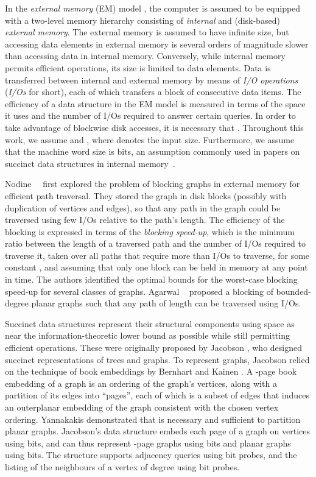 In the \emph{external memory} (EM) model \cite{DBLP:journals/cacm/AggarwalV88}, the
computer is assumed to be equipped with a two-level memory hierarchy
consisting of \emph{internal} and (disk-based) \emph{external memory}.
The external memory is assumed to have infinite size, but accessing data
elements in external memory is several orders of magnitude slower than accessing
data in internal memory.
Conversely, while internal memory permits efficient operations, its size is limited 
to  data elements.
Data is transferred between internal and external memory by means of
\emph{I/O operations} (\emph{I/Os} for short), each of which transfers
a block of  consecutive data items. 
The efficiency of a data structure in the EM model is measured in terms of the
space it uses and the number of I/Os required to answer certain queries.
In order to take advantage of blockwise disk accesses, it is necessary that .
Throughout this work, we assume  and ,
where  denotes the input size. Furthermore, we assume that the machine
word size is  bits, an assumption commonly used 
in papers on succinct data structures in internal 
memory~\cite{DBLP:journals/talg/RamanRS07}.

Nodine~\etal~\cite{ngv_1996} first explored the problem of blocking
graphs in external memory for efficient path traversal. 
They stored the
 graph in disk blocks (possibly with duplication of
vertices and edges), so that any path in the graph could be traversed
using few I/Os relative to the path's length.
The efficiency of the blocking is expressed in terms
of the \emph{blocking speed-up}, which is the minimum ratio between
the length of a traversed path and the number of I/Os required to
traverse it, taken over all paths that require more than  I/Os to
traverse, for some constant , and assuming that only one block can
be held in memory at any point in time.
The authors identified the optimal bounds for the worst-case blocking speed-up
for several classes of graphs.
Agarwal \etal~\cite{DBLP:conf/soda/AgarwalAMVV98} proposed a
blocking of bounded-degree planar graphs such that any path of length
 can be traversed using  I/Os.

Succinct data structures represent their structural
components using space as near the information-theoretic lower bound as
possible while still permitting efficient operations.
These were originally proposed by Jacobson
\cite{jac_1989}, who designed succinct representations of trees and
graphs.
To represent graphs, Jacobson relied on the technique of book
embeddings by Bernhart and Kainen
\cite{DBLP:journals/jct/BernhartK79}.
A -page book embedding of a graph is an ordering of the graph's vertices,
along with a partition of its edges into  ``pages'',
each of which is a subset of edges that induces an outerplanar embedding of
the graph consistent with the chosen vertex ordering.
Yannakakis \cite{DBLP:conf/stoc/Yannakakis86}
demonstrated that  is necessary and sufficient to partition
planar graphs.
Jacobson's data structure embeds each page of a graph
on  vertices using  bits, and can thus represent
-page graphs using  bits and planar graphs using
 bits.
The structure supports adjacency queries using
 bit probes, and the listing of the neighbours of a
vertex  of degree  using  bit
probes.

